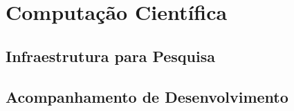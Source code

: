 \chapter{Computação Científica}

\section{Infraestrutura para Pesquisa}

\section{Acompanhamento de Desenvolvimento}

